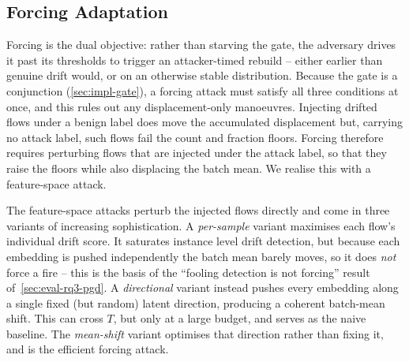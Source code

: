\subsection{Forcing Adaptation}
\label{sec:impl-force}
\label{sec:impl-pgd}
Forcing is the dual objective: rather than starving the gate, the adversary drives it past its thresholds to trigger an attacker-timed rebuild -- either earlier than genuine drift would, or on an otherwise stable distribution. Because the gate is a conjunction (\cref{sec:impl-gate}), a forcing attack must satisfy all three conditions at once, and this rules out any displacement-only manoeuvres. Injecting drifted flows under a benign label does move the accumulated displacement but, carrying no attack label, such flows fail the count and fraction floors. Forcing therefore requires perturbing flows that are injected under the attack label, so that they raise the floors while also displacing the batch mean. We realise this with a feature-space attack.

The feature-space attacks perturb the injected flows directly and come in three variants of increasing sophistication. A \emph{per-sample} variant maximises each flow's individual drift score. It saturates instance level drift detection, but because each embedding is pushed independently the batch mean barely moves, so it does \emph{not} force a fire -- this is the basis of the ``fooling detection is not forcing'' result of~\cref{sec:eval-rq3-pgd}. A \emph{directional} variant instead pushes every embedding along a single fixed (but random) latent direction, producing a coherent batch-mean shift. This can cross $T$, but only at a large budget, and serves as the naive baseline. The \emph{mean-shift} variant optimises that direction rather than fixing it, and is the efficient forcing attack.

